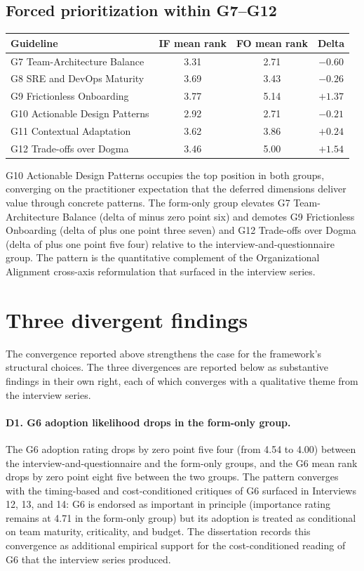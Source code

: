 \subsection*{Forced prioritization within G7--G12}

\begin{longtable}{p{3cm} c c c}
\toprule
\textbf{Guideline} & \textbf{IF mean rank} & \textbf{FO mean rank} & \textbf{Delta} \\
\midrule
\endhead
G7 Team-Architecture Balance & 3.31 & 2.71 & $-0.60$ \\
G8 SRE and DevOps Maturity & 3.69 & 3.43 & $-0.26$ \\
G9 Frictionless Onboarding & 3.77 & 5.14 & $+1.37$ \\
G10 Actionable Design Patterns & 2.92 & 2.71 & $-0.21$ \\
G11 Contextual Adaptation & 3.62 & 3.86 & $+0.24$ \\
G12 Trade-offs over Dogma & 3.46 & 5.00 & $+1.54$ \\
\bottomrule
\end{longtable}

\noindent
G10 Actionable Design Patterns occupies the top position in both groups, converging on the practitioner expectation that the deferred dimensions deliver value through concrete patterns. The form-only group elevates G7 Team-Architecture Balance (delta of minus zero point six) and demotes G9 Frictionless Onboarding (delta of plus one point three seven) and G12 Trade-offs over Dogma (delta of plus one point five four) relative to the interview-and-questionnaire group. The pattern is the quantitative complement of the Organizational Alignment cross-axis reformulation that surfaced in the interview series.

\section*{Three divergent findings}

The convergence reported above strengthens the case for the framework's structural choices. The three divergences are reported below as substantive findings in their own right, each of which converges with a qualitative theme from the interview series.

\paragraph*{D1. G6 adoption likelihood drops in the form-only group.} The G6 adoption rating drops by zero point five four (from 4.54 to 4.00) between the interview-and-questionnaire and the form-only groups, and the G6 mean rank drops by zero point eight five between the two groups. The pattern converges with the timing-based and cost-conditioned critiques of G6 surfaced in Interviews 12, 13, and 14: G6 is endorsed as important in principle (importance rating remains at 4.71 in the form-only group) but its adoption is treated as conditional on team maturity, criticality, and budget. The dissertation records this convergence as additional empirical support for the cost-conditioned reading of G6 that the interview series produced.

